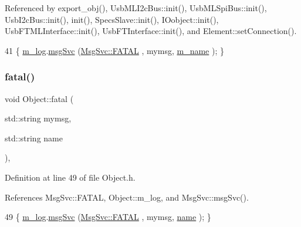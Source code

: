 Referenced by export\+\_\+obj(), Usb\+M\+L\+I2c\+Bus\+::init(), Usb\+M\+L\+Spi\+Bus\+::init(), Usb\+I2c\+Bus\+::init(), init(), Specs\+Slave\+::init(), I\+Oobject\+::init(), Usb\+F\+T\+M\+L\+Interface\+::init(), Usb\+F\+T\+Interface\+::init(), and Element\+::set\+Connection().


\begin{DoxyCode}
41 \{ \hyperlink{classObject_a0d269813dd7ac1f24bc143031e2963f2}{m\_log}.\hyperlink{classMsgSvc_ad25f18047920cc59a314e5098259711c}{msgSvc} (\hyperlink{classMsgSvc_ae671eb7301996cd049d2da8a65925926a59c73cb29edfc9cdf35845e2b1301363}{MsgSvc::FATAL}   , mymsg, \hyperlink{classObject_a8b83c95c705d2c3ba0d081fe1710f48d}{m\_name} ); \}
\end{DoxyCode}
\mbox{\label{classObject_ae62acd3d09f716220f75f252dc38bc9a}} 
\subsubsection{\texorpdfstring{fatal()}{fatal()}\hspace{0.1cm}{\footnotesize\ttfamily [2/2]}}
{\footnotesize\ttfamily void Object\+::fatal (\begin{DoxyParamCaption}\item[{std\+::string}]{mymsg,  }\item[{std\+::string}]{name }\end{DoxyParamCaption})\hspace{0.3cm}{\ttfamily [inline]}, {\ttfamily [inherited]}}



Definition at line 49 of file Object.\+h.



References Msg\+Svc\+::\+F\+A\+T\+AL, Object\+::m\+\_\+log, and Msg\+Svc\+::msg\+Svc().


\begin{DoxyCode}
49 \{ \hyperlink{classObject_a0d269813dd7ac1f24bc143031e2963f2}{m\_log}.\hyperlink{classMsgSvc_ad25f18047920cc59a314e5098259711c}{msgSvc} (\hyperlink{classMsgSvc_ae671eb7301996cd049d2da8a65925926a59c73cb29edfc9cdf35845e2b1301363}{MsgSvc::FATAL}   , mymsg, \hyperlink{classObject_a300f4c05dd468c7bb8b3c968868443c1}{name} ); \}
\end{DoxyCode}
\mbox{\label{classHierarchy_a255174fe4d316d2a3f430dcb9dab29f1}} 
